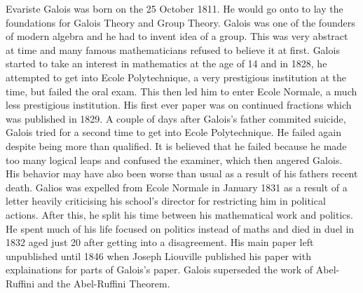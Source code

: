 Evariste Galois was born on the 25 October 1811. He would go onto to lay the foundations for Galois Theory and Group Theory. Galois was one of the founders of modern algebra and he had to invent idea of a group. This was very abstract at time and many famous mathematicians refused to believe it at first. Galois started to take an interest in mathematics at the age of 14 and in 1828, he attempted to get into Ecole Polytechnique, a very prestigious institution at the time, but failed the oral exam. This then led him to enter Ecole Normale, a much less prestigious institution. His first ever paper was on continued fractions which was published in 1829. A couple of days after Galois's father commited suicide, Galois tried for a second time to get into Ecole Polytechnique. He failed again despite being more than qualified. It is believed that he failed because he made too many logical leaps and confused the examiner, which then angered Galois. His behavior may have also been worse than usual as a result of his fathers recent death. Galios was expelled from Ecole Normale in January 1831 as a result of a letter heavily criticising his school's director for restricting him in political actions. After this, he split his time between his mathematical work and politics. He spent much of his life focused on politics instead of maths and died in duel in 1832 aged just 20 after getting into a disagreement. His main paper left unpublished until 1846 when Joseph Liouville published his paper with explainations for parts of Galois's paper. Galois superseded the work of Abel-Ruffini and the Abel-Ruffini Theorem.
